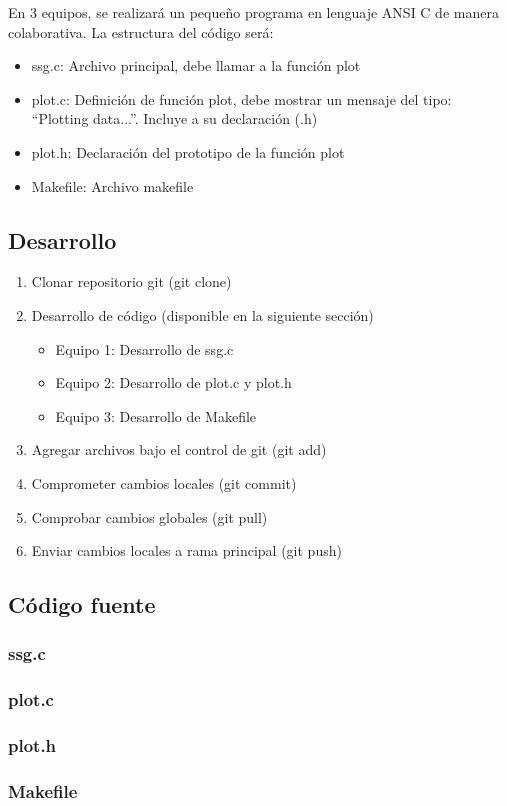 \documentclass[letter, 10pt]{article}
\begin{document}
 En 3 equipos, se realizará un pequeño programa en lenguaje ANSI C de manera colaborativa. La estructura del código será:

\begin{itemize}
	\item ssg.c: Archivo principal, debe llamar a la función plot
	\item plot.c: Definición de función plot, debe mostrar un mensaje del tipo: ``Plotting data...''. Incluye a su declaración (.h)
	\item plot.h: Declaración del prototipo de la función plot
	\item Makefile: Archivo makefile
\end{itemize}

\subsection{Desarrollo}

\begin{enumerate}

	\item Clonar repositorio git (git clone)
	\item Desarrollo de código (disponible en la siguiente sección)

		\begin{itemize}
			\item Equipo 1: Desarrollo de ssg.c
			\item Equipo 2: Desarrollo de plot.c y plot.h
			\item Equipo 3: Desarrollo de Makefile
		\end{itemize}

	\item Agregar archivos bajo el control de git (git add)
	\item Comprometer cambios locales (git commit)
	\item Comprobar cambios globales (git pull)
	\item Enviar cambios locales a rama principal (git push)

\end{enumerate}

\subsection{Código fuente}
\subsubsection{ssg.c}

\subsubsection{plot.c}

\subsubsection{plot.h}

\subsubsection{Makefile}

\end{document}
